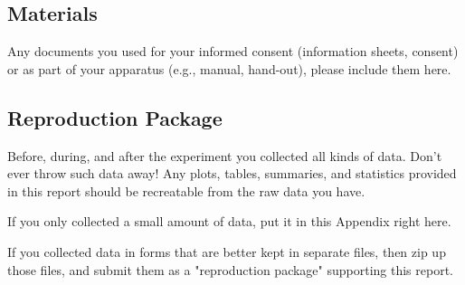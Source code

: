 \documentclass{article}
\begin{document}
\subsection{Materials}
Any documents you used for your informed consent (information sheets, consent) or as part of your apparatus (e.g., manual, hand-out), please include them here.

\subsection{Reproduction Package}
Before, during, and after the experiment you collected all kinds of data. Don't ever throw such data away! Any plots, tables, summaries, and statistics provided in this report should be recreatable from the raw data you have.

If you only collected a small amount of data, put it in this Appendix right here.

If you collected data in forms that are better kept in separate files, then zip up those files, and submit them as a "reproduction package" supporting this report.
\end{document}
